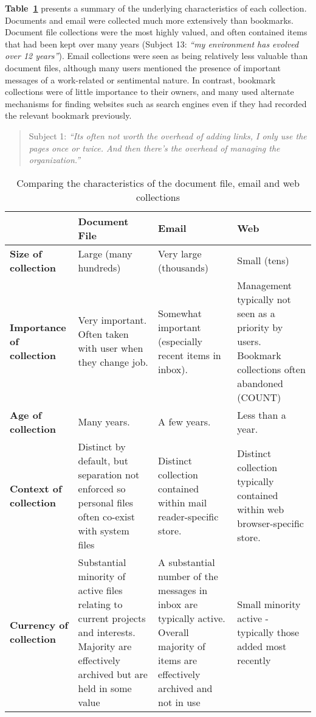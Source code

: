\textbf{Table~\ref{table:chapter3_collection_characteristics}} presents a summary of the underlying characteristics of each collection.  Documents and email were collected much more extensively than bookmarks.  Document file collections were the most highly valued, and often contained items that had been kept over many years (Subject 13: \textit{``my environment has evolved over 12 years''}).  Email collections were seen as being relatively less valuable than document files, although many users mentioned the presence of important messages of a work-related or sentimental nature.  In contrast, bookmark collections were of little importance to their owners, and many used alternate mechanisms for finding websites such as search engines even if they had recorded the relevant bookmark previously.
\begin{quote}
Subject 1: \textit{``Its often not worth the overhead of adding links, I only use the pages once or twice. And then there's the overhead of managing the organization.''}
\end{quote}

\begin{table}[h]
\begin{center}
\begin{footnotesize}
\begin{tabular}{|p{2.5cm}|p{3.5cm}|p{3.5cm}|p{3.5cm}|}
\hline
	& {\bf Document File} & {\bf Email} &  {\bf Web} \\
\hline \hline
{\bf Size of collection} & Large (many hundreds) & Very large (thousands) & Small (tens) \\
\hline
{\bf Importance of collection} & Very important. Often taken with user when they change job. & Somewhat important (especially recent items in inbox).  & Management typically not seen as a priority by users. Bookmark collections often abandoned (COUNT) \\
\hline
{\bf Age of collection} & Many years.  & A few years. & Less than a year.   \\
\hline
{\bf Context of collection} & Distinct by default, but separation not enforced so personal files often co-exist with system files & Distinct collection contained within mail reader-specific store. & Distinct collection typically contained within web browser-specific store. \\
\hline
{\bf Currency of collection} & Substantial minority of active files relating to current projects and interests. Majority are effectively archived but are held in some value & A substantial number of the messages in inbox are typically active.  Overall majority of items are effectively archived and not in use & Small minority active - typically those added most recently \\
\hline
\end{tabular}  
\end{footnotesize}
\caption{Comparing the characteristics of the document file, email and web  collections}
\label{table:chapter3_collection_characteristics}
\end{center}
\end{table}
\normalsize


